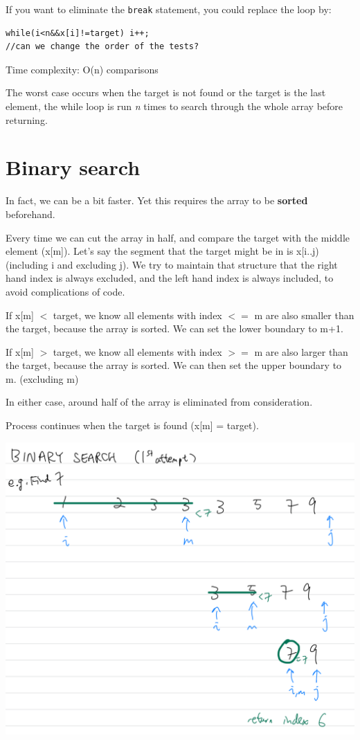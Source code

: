 If you want to eliminate the \texttt{break} statement, you could replace the loop by:

\begin{lstlisting}
while(i<n&&x[i]!=target) i++;
//can we change the order of the tests?
\end{lstlisting}

Time complexity: O(n) comparisons
\vspace{6mm}

The worst case occurs when the target is not found or the target is the last element, the while loop is run \textit{n} times to search through the whole array before returning.

\pagebreak

\section{Binary search}

In fact, we can be a bit faster. Yet this requires the array to be \textbf{sorted} beforehand.

Every time we can cut the array in half, and compare the target with the middle element (x[m]). Let's say the segment that the target might be in is x[i..j) (including i and excluding j). We try to maintain that structure that the right hand index is always excluded, and the left hand index is always included, to avoid complications of code.
\vspace{6mm}

If x[m] $<$ target, we know all elements with index $<=$ m are also smaller than the target, because the array is sorted. We can set the lower boundary to m+1.

If x[m] $>$ target, we know all elements with index $>=$ m are also larger than the target, because the array is sorted. We can then set the upper boundary to m. (excluding m)

In either case, around half of the array is eliminated from consideration.

Process continues when the target is found (x[m] = target).
\vspace{6mm}

\includegraphics[width=14cm]{images/ch7-binarysearch1.png}
\pagebreak

